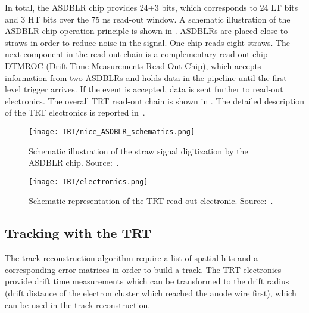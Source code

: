 In total, the ASDBLR chip provides 24+3 bits, which corresponds to 24 LT bits and 3 HT bits over the 75 ns read-out window.
A schematic illustration of the ASDBLR chip operation principle is shown in .
ASDBLRs are placed close to straws in order to reduce noise in the signal. One chip reads eight straws.
The next component in the read-out chain is a complementary read-out chip DTMROC (Drift Time Measurements Read-Out Chip), which accepts 
information from two ASDBLRs and holds data in the pipeline until the first level trigger arrives. If the event is accepted, data is sent further to read-out electronics.
The overall TRT read-out chain is shown in . The detailed description of the TRT electronics is reported in~\cite{TRT_electronics}.

\begin{figure}
\centering
\texttt{[image: TRT/nice\_ASDBLR\_schematics.png]}
\caption{ 
 Schematic illustration of the straw signal digitization by the ASDBLR chip. Source:~\cite{Aad:2008zzm}.
}
\label{fig:nice_asdblr_schematics}
\end{figure}


\begin{figure}
\centering
\texttt{[image: TRT/electronics.png]}
\caption{ 
 Schematic representation of the TRT read-out electronic. Source:~\cite{TRT_electronics}.
}
\label{fig:electronics}
\end{figure}



\subsection{Tracking with the TRT}
\label{subsec:tracking_with_trt}

The track reconstruction algorithm require a list of spatial hits and a corresponding error matrices in order to build a track. The TRT electronics provide drift time measurements which can be transformed to the
drift radius (drift distance of the electron cluster which reached the anode wire first), which can be used in the track reconstruction.

